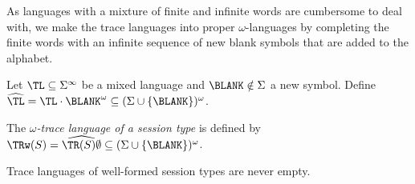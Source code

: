 As languages with a mixture of finite and infinite words are cumbersome to deal with, we make the
trace languages into proper $\omega$-languages by completing the finite words with an infinite
sequence of new blank symbols that are added to the alphabet.
\begin{definition}
  Let ${\TL} \subseteq \Sigma^\infty$ be a mixed language and $\BLANK \notin \Sigma$ a new
  symbol. Define   $\widehat{{\TL}} = {\TL} \cdot \BLANK^\omega \subseteq (\Sigma\cup\{\BLANK\})^\omega$. 

  The \emph{$\omega$-trace language of a session type} is defined by $\TRw (S) = \widehat{\TR
    (S)\emptyset} \subseteq (\Sigma\cup\{\BLANK\})^\omega$.
\end{definition}
\begin{lemma}\label{lemma:trw-never-empty}
  Trace languages of well-formed session types are never empty.
\end{lemma}

